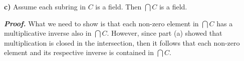 \documentclass[12pt, a4paper]{article}
\begin{document}
\begin{addmargin}[1.5em]{1.5em}
    
    \textbf{c)} Assume each subring in $C$ is a field. Then $\bigcap C$ is a field.
    
    \vspace{4mm}
    
    \noindent\textbf{\textit{Proof.}} What we need to show is that each non-zero element in $\bigcap C$ has a multiplicative inverse also in $\bigcap C$. However, since part (a) showed that multiplication is closed in the intersection, then it follows that each non-zero element and its respective inverse is contained in $\bigcap C$.\hspace{75mm}\square 

\end{addmargin}
\end{document}

